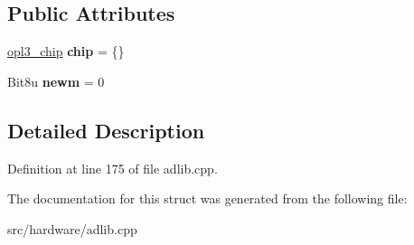 \subsection*{Public Attributes}
\begin{DoxyCompactItemize}
\item 
\hypertarget{structNukedOPL_1_1Handler_a9c5310036580811bf25b820f4cc6f5d4}{\hyperlink{struct__opl3__chip}{opl3\-\_\-chip} {\bfseries chip} = \{\}}\label{structNukedOPL_1_1Handler_a9c5310036580811bf25b820f4cc6f5d4}

\item 
\hypertarget{structNukedOPL_1_1Handler_a0cf77496c03fd14a5a76180d01c843e9}{Bit8u {\bfseries newm} = 0}\label{structNukedOPL_1_1Handler_a0cf77496c03fd14a5a76180d01c843e9}

\end{DoxyCompactItemize}


\subsection{Detailed Description}


Definition at line 175 of file adlib.\-cpp.



The documentation for this struct was generated from the following file\-:\begin{DoxyCompactItemize}
\item 
src/hardware/adlib.\-cpp\end{DoxyCompactItemize}
